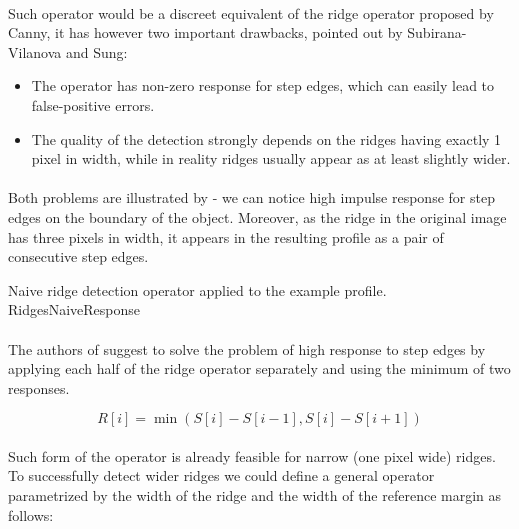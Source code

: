 \paragraph*{}
Such operator would be a discreet equivalent of the ridge operator proposed by Canny\cite{Canny86}, it has however two important drawbacks, pointed out by Subirana-Vilanova and Sung\cite{Subirana-VilanovaSung93}:

\begin{itemize}
	\item The operator has non-zero response for step edges, which can easily lead to false-positive errors.
	\item The quality of the detection strongly depends on the ridges having exactly 1 pixel in width, while in reality ridges usually appear as at least slightly wider.
\end{itemize}

\paragraph*{}
Both problems are illustrated by  - we can notice high impulse response for step edges on the boundary of the object. Moreover, as the ridge in the original image has three pixels in width, it appears in the resulting profile as a pair of consecutive step edges.

\profileFigure
{
}
{Naive ridge detection operator applied to the example profile.}
{RidgesNaiveResponse}

\paragraph*{}
The authors of \cite{Subirana-VilanovaSung93} suggest to solve the problem of high response to step edges by applying each half of the ridge operator separately and using the minimum of two responses.

\[
	R[i] = \min(S[i]-S[i-1],S[i]-S[i+1])
\]

\paragraph*{}
Such form of the operator is already feasible for narrow (one pixel wide) ridges. To successfully detect wider ridges we could define a general operator parametrized by the width of the ridge and the width of the reference margin as follows:

